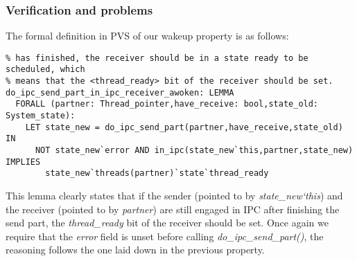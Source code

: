 \subsubsection{Verification and problems}
The formal definition in PVS of our wakeup property is as follows:

\lstset{language=PVS}
\begin{lstlisting}[caption={PVS: property 2, formal definition.}]
% When the sender- and receiver are still engaged in IPC after the send part
% has finished, the receiver should be in a state ready to be scheduled, which
% means that the <thread_ready> bit of the receiver should be set.
do_ipc_send_part_in_ipc_receiver_awoken: LEMMA
  FORALL (partner: Thread_pointer,have_receive: bool,state_old: System_state):
    LET state_new = do_ipc_send_part(partner,have_receive,state_old) IN
      NOT state_new`error AND in_ipc(state_new`this,partner,state_new) IMPLIES
        state_new`threads(partner)`state`thread_ready 
\end{lstlisting}

This lemma clearly states that if the sender (pointed to by \emph{state\_new`this}) and the receiver (pointed to by \emph{partner}) are still engaged in IPC after finishing the send part, the \emph{thread\_ready} bit of the receiver should be set. Once again we require that the \emph{error} field is unset before calling \emph{do\_ipc\_send\_part()}, the reasoning follows the one laid down in the previous property.

